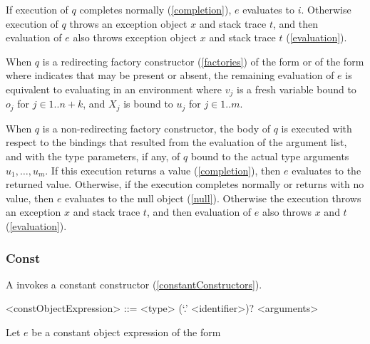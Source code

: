 \documentclass[makeidx]{article}
\begin{document}
\LMHash{}%
If execution of $q$ completes normally (\ref{completion}), $e$ evaluates to $i$.
Otherwise execution of $q$ throws an exception object $x$ and stack trace $t$,
and then evaluation of $e$ also throws exception object $x$ and stack trace $t$
(\ref{evaluation}).

\LMHash{}%
When $q$ is a redirecting factory constructor
(\ref{factories})
of the form  or
of the form 
where  indicates that \CONST{} may be present or absent,
the remaining evaluation of $e$ is equivalent to
evaluating
in an environment where
$v_j$ is a fresh variable bound to $o_j$ for $j \in 1 .. n + k$, and
$X_j$ is bound to $u_j$ for $j \in 1 .. m$.

\LMHash{}%
When $q$ is a non-redirecting factory constructor,
the body of $q$ is executed with respect to
the bindings that resulted from the evaluation of the argument list,
and with the type parameters, if any, of $q$ bound to
the actual type arguments $u_1, \ldots, u_m$.
If this execution returns a value (\ref{completion}),
then $e$ evaluates to the returned value.
Otherwise, if the execution completes normally or returns with no value,
then $e$ evaluates to the null object (\ref{null}).
Otherwise the execution throws an exception $x$ and stack trace $t$,
and then evaluation of $e$ also throws $x$ and $t$ (\ref{evaluation}).



\subsubsection{Const}

\LMHash{}%
A  invokes a constant constructor
(\ref{constantConstructors}).

\begin{grammar}
<constObjectExpression> ::= \CONST{} <type> (`.' <identifier>)? <arguments>
\end{grammar}

\LMHash{}%
Let $e$ be a constant object expression of the form
\end{document}
